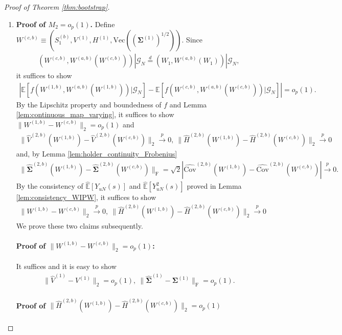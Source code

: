 \documentclass[12pt]{article}
\newcommand{\E}{\mathbb E}								%
\newcommand{\convp}{\overset p \rightarrow}             %
\begin{document}
\begin{proof}[Proof of Theorem \ref{thm:bootstrap}]
\begin{enumerate}
		\item \textbf{Proof of $M_2=o_p(1)$.} Define $W^{(c,b)}\equiv (S_1^{(b)}, V^{(1)}, H^{(1)},\mathrm{Vec}(({\bm\Sigma}^{(1)})^{1/2}))$. Since
		\begin{align*}
			(W^{(c,b)},W^{(a,b)}(W^{(c,b)}))|\mathcal{G}_N\overset{d}{=}(W_1,W^{(a,b)}(W_1))|\mathcal{G}_N,
		\end{align*}
		it suffices to show
		\begin{align*}
			\left|\E[f(W^{(1,b)},W^{(a,b)}(W^{(1,b)}))|\mathcal{G}_N]-\E[f(W^{(c,b)},W^{(a,b)}(W^{(c,b)}))|\mathcal{G}_N]\right|=o_p(1).
		\end{align*}
		By the Lipschitz property and boundedness of $f$ and Lemma \ref{lem:continuous_map_varying}, it suffices to show $\|W^{(1,b)}-W^{(c,b)}\|_2=o_p(1)$ and
		\begin{align*}
			\|\hat{V}^{(2,b)}(W^{(1,b)})-\hat{V}^{(2,b)}(W^{(c,b)})\|_2\convp 0,\ \|\hat{H}^{(2,b)}(W^{(1,b)})-\hat{H}^{(2,b)}(W^{(c,b)})\|_2\convp 0
		\end{align*}
		and, by Lemma \ref{lem:holder_continuity_Frobenius}
		\begin{align*}
			\|\hat{\bm \Sigma}^{(2,b)}(W^{(1,b)})-\hat{\bm \Sigma}^{(2,b)}(W^{(c,b)})\|_{\mathrm{F}}=\sqrt{2}|\hat {\mathrm{Cov}}^{(2,b)}(W^{(1,b)})-\hat {\mathrm{Cov}}^{(2,b)}(W^{(c,b)})|\convp 0.
		\end{align*}
		By the consistency of $\hat{\mathbb E}[Y_{uN}(s)]$ and $\hat{\mathbb E}[Y^2_{uN}(s)]$ proved in Lemma \ref{lem:consistency_WIPW}, it suffices to show 
		\begin{align*}
			\|W^{(1,b)}-W^{(c,b)}\|_2\convp 0,\ \|\hat{H}^{(2,b)}(W^{(1,b)})-\hat{H}^{(2,b)}(W^{(c,b)})\|_2\convp 0
		\end{align*}
		We prove these two claims subsequently. 
		\paragraph{Proof of $\|W^{(1,b)}-W^{(c,b)}\|_2=o_p(1)$:}
		It suffices and it is easy to show
		\begin{align}\label{eq:convergence_V_Sigma_bootstrap}
			\|\hat{V}^{(1)}-V^{(1)}\|_2=o_p(1),\ \|\hat{\bm\Sigma}^{(1)}-\bm\Sigma^{(1)}\|_{\mathrm{F}}=o_p(1).
		\end{align}
		
		\paragraph{Proof of $\|\hat{H}^{(2,b)}(W^{(1,b)})-\hat{H}^{(2,b)}(W^{(c,b)})\|_2=o_p(1)$}


\end{enumerate}
\end{proof}
\end{document}

